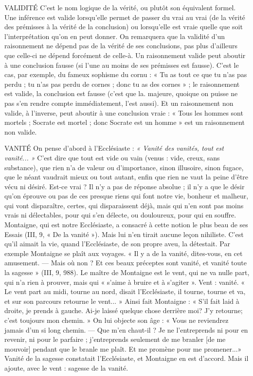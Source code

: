VALIDITÉ C’est le nom logique de la vérité, ou plutôt son équivalent formel.
Une inférence est valide lorsqu’elle permet de passer du vrai
au vrai (de la vérité des prémisses à la vérité de la conclusion) ou lorsqu'elle est
vraie quelle que soit l'interprétation qu’on en peut donner. On remarquera que
la validité d’un raisonnement ne dépend pas de la vérité de ses conclusions, pas
plus d’ailleurs que celle-ci ne dépend forcément de celle-à. Un raisonnement
valide peut aboutir à une conclusion fausse (si l’une au moins de ses prémisses
est fausse). C’est le cas, par exemple, du fameux sophisme du cornu : « Tu as
tout ce que tu n’as pas perdu ; tu n’as pas perdu de cornes ; donc tu as des
cornes » ; le raisonnement est valide, la conclusion est fausse (c’est que la.
majeure, quoique on puisse ne pas s’en rendre compte immédiatement, l’est
aussi). Et un raisonnement non valide, à l’inverse, peut aboutir à une conclusion
vraie : « Tous les hommes sont mortels ; Socrate est mortel ; donc Socrate
est un homme » est un raisonnement non valide.

VANITÉ On pense d’abord à l’Ecclésiaste : {\it « Vanité des vanités, tout est
vanité... »} C’est dire que tout est vide ou vain (venus : vide, creux,
sans substance), que rien n’a de valeur ou d’importance, sinon illusoire, sinon
fugace, que le néant vaudrait mieux ou tout autant, enfin que rien ne vaut la
peine d’être vécu ni désiré. Est-ce vrai ? Il n’y a pas de réponse absolue ; il n’y
a que le désir qu’on éprouve ou pas de ces presque riens qui font notre vie, bonheur
et malheur, qui vont disparaître, certes, qui disparaissent déjà, mais qui
n’en sont pas moins vrais ni délectables, pour qui s’en délecte, ou douloureux,
pour qui en souffre. Montaigne, qui est notre Ecclésiaste, a consacré à cette
notion le plus beau de ses Essais (III, 9, « De la vanité »). Mais lui n’en tirait
aucune leçon nihiliste. C’est qu’il aimait la vie, quand l’Ecclésiaste, de son
propre aveu, la détestait. Par exemple Montaigne se plaît aux voyages. « Il y a
de la vanité, dites-vous, en cet amusement. — Mais où non ? Et ces beaux préceptes
sont vanité, et vanité toute la sagesse » (III, 9, 988). Le maître de Montaigne
est le vent, qui ne va nulle part, qui n’a rien à prouver, mais qui « s’aime
à bruire et à s’agiter ». Vent : vanité. « Le vent part au midi, tourne au nord,
disait l’Ecclésiaste, il tourne, tourne et va, et sur son parcours retourne le
vent... » Ainsi fait Montaigne : « S'il fait laid à droite, je prends à gauche. Ai-je
laissé quelque chose derrière moi? J'y retourne; c’est toujours mon
chemin. » On lui objecte son âge : « Vous ne reviendrez jamais d’un si long
chemin. — Que m'en chaut-il ? Je ne l’entreprends ni pour en revenir, ni pour
le parfaire ; j’entreprends seulement de me branler [de me mouvoir] pendant
que le branle me plaît. Et me promène pour me promener...» Vanité de la
sagesse constatait l’Ecclésiaste, et Montaigne en est d’accord. Mais il ajoute,
avec le vent : sagesse de la vanité.

